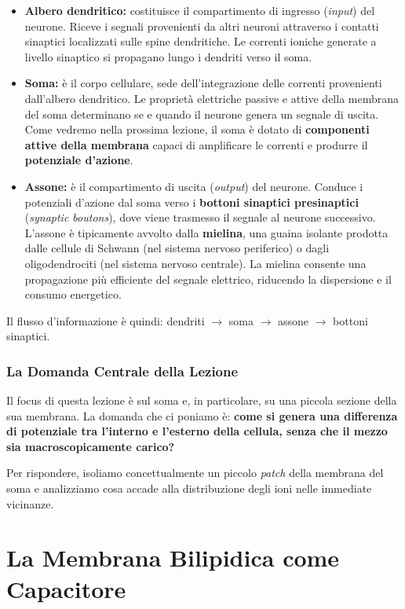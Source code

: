 \begin{itemize}
    \item \textbf{Albero dendritico:} costituisce il compartimento di ingresso (\textit{input}) del neurone. Riceve i segnali provenienti da altri neuroni attraverso i contatti sinaptici localizzati sulle spine dendritiche. Le correnti ioniche generate a livello sinaptico si propagano lungo i dendriti verso il soma.
    \item \textbf{Soma:} è il corpo cellulare, sede dell'integrazione delle correnti provenienti dall'albero dendritico. Le proprietà elettriche passive e attive della membrana del soma determinano se e quando il neurone genera un segnale di uscita. Come vedremo nella prossima lezione, il soma è dotato di \textbf{componenti attive della membrana} capaci di amplificare le correnti e produrre il \textbf{potenziale d'azione}.
    \item \textbf{Assone:} è il compartimento di uscita (\textit{output}) del neurone. Conduce i potenziali d'azione dal soma verso i \textbf{bottoni sinaptici presinaptici} (\textit{synaptic boutons}), dove viene trasmesso il segnale al neurone successivo. L'assone è tipicamente avvolto dalla \textbf{mielina}, una guaina isolante prodotta dalle cellule di Schwann (nel sistema nervoso periferico) o dagli oligodendrociti (nel sistema nervoso centrale). La mielina consente una propagazione più efficiente del segnale elettrico, riducendo la dispersione e il consumo energetico.
\end{itemize}

Il flusso d'informazione è quindi: dendriti $\rightarrow$ soma $\rightarrow$ assone $\rightarrow$ bottoni sinaptici.

\subsubsection{La Domanda Centrale della Lezione}

Il focus di questa lezione è sul soma e, in particolare, su una piccola sezione della sua membrana. La domanda che ci poniamo è: \textbf{come si genera una differenza di potenziale tra l'interno e l'esterno della cellula, senza che il mezzo sia macroscopicamente carico?}

Per rispondere, isoliamo concettualmente un piccolo \textit{patch} della membrana del soma e analizziamo cosa accade alla distribuzione degli ioni nelle immediate vicinanze.

\section{La Membrana Bilipidica come Capacitore}

